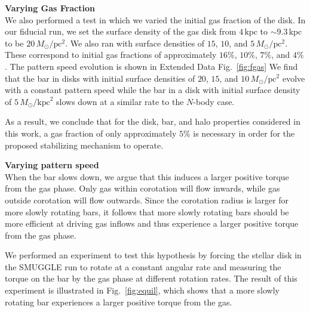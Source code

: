 \documentclass{natureprintstyle}
\newcommand{\Nbody}{$N$-body}
\newcommand{\Msun}{\ensuremath{M_{\odot}}}
\begin{document}
\vspace{12pt}

\noindent
{\bf Varying Gas Fraction}
\\
\noindent
We also performed a test in which we varied the initial gas fraction of the
disk. In our fiducial run, we set the surface density of the gas disk from
$4\,\textrm{kpc}$ to $\sim9.3\,\textrm{kpc}$ to be $20\,\Msun/\textrm{pc}^2$.
We also ran with surface densities of $15$, $10$, and
$5\,\Msun/\textrm{pc}^2$. These correspond to initial gas fractions of
approximately $16\%$, $10\%$, $7\%$, and $4\%$. The pattern speed evolution is
shown in Extended Data Fig.~\ref{fig:fgas} We find that the bar in disks with
initial surface densities of $20$, $15$, and $10\,\Msun/\textrm{pc}^2$ evolve
with a constant pattern speed while the bar in a disk with initial surface
density of $5\,\Msun/\textrm{kpc}^2$ slows down at a similar rate to the \Nbody{} case.

As a result, we conclude that for the disk, bar, and halo properties
considered in this work, a gas fraction of only approximately $5\%$ is
necessary in order for the proposed stabilizing mechanism to operate.

\vspace{12pt}

\noindent
{\bf Varying pattern speed}
\\
\noindent
When the bar slows down, we argue that this induces a larger positive torque
from the gas phase. Only gas within corotation will flow inwards, while gas
outside corotation will flow outwards.\cite{2011MNRAS.415.1027H} Since the
corotation radius is larger for more slowly rotating bars, it follows that
more slowly rotating bars should be more efficient at driving gas inflows and
thus experience a larger positive torque from the gas phase.

We performed an experiment to test this hypothesis by forcing the stellar disk
in the SMUGGLE run to rotate at a constant angular rate and measuring the
torque on the bar by the gas phase at different rotation rates. The result of
this experiment is illustrated in Fig.~\ref{fig:equil}, which shows that a more
slowly rotating bar experiences a larger positive torque from the gas. 

\vspace{12pt}
\end{document}
